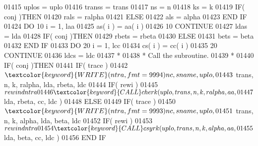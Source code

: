 \begin{DoxyCode}
01415                         uplos = uplo
01416                         transs = trans
01417                         ns = n
01418                         ks = k
01419                         \textcolor{keywordflow}{IF}( conj )\textcolor{keywordflow}{THEN}
01420                            rals = ralpha
01421                         \textcolor{keywordflow}{ELSE}
01422                            als = alpha
01423 \textcolor{keywordflow}{                        END IF}
01424                         \textcolor{keywordflow}{DO} 10 i = 1, laa
01425                            as( i ) = aa( i )
01426    10                   \textcolor{keywordflow}{CONTINUE}
01427                         ldas = lda
01428                         \textcolor{keywordflow}{IF}( conj )\textcolor{keywordflow}{THEN}
01429                            rbets = rbeta
01430                         \textcolor{keywordflow}{ELSE}
01431                            bets = beta
01432 \textcolor{keywordflow}{                        END IF}
01433                         \textcolor{keywordflow}{DO} 20 i = 1, lcc
01434                            cs( i ) = cc( i )
01435    20                   \textcolor{keywordflow}{CONTINUE}
01436                         ldcs = ldc
01437 \textcolor{comment}{*}
01438 \textcolor{comment}{*                       Call the subroutine.}
01439 \textcolor{comment}{*}
01440                         \textcolor{keywordflow}{IF}( conj )\textcolor{keywordflow}{THEN}
01441                            \textcolor{keywordflow}{IF}( trace )
01442      $                        \textcolor{keyword}{WRITE}( ntra, fmt = 9994 )nc, sname, uplo,
01443      $                        trans, n, k, ralpha, lda, rbeta, ldc
01444                            \textcolor{keywordflow}{IF}( rewi )
01445      $                        rewind ntra
01446                            \textcolor{keyword}{CALL }cherk( uplo, trans, n, k, ralpha, aa,
01447      $                                 lda, rbeta, cc, ldc )
01448                         \textcolor{keywordflow}{ELSE}
01449                            \textcolor{keywordflow}{IF}( trace )
01450      $                        \textcolor{keyword}{WRITE}( ntra, fmt = 9993 )nc, sname, uplo,
01451      $                        trans, n, k, alpha, lda, beta, ldc
01452                            \textcolor{keywordflow}{IF}( rewi )
01453      $                        rewind ntra
01454                            \textcolor{keyword}{CALL }csyrk( uplo, trans, n, k, alpha, aa,
01455      $                                 lda, beta, cc, ldc )
01456 \textcolor{keywordflow}{                        END IF}

\end{DoxyCode}
